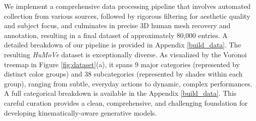 We implement a comprehensive data processing pipeline that involves automated collection from various sources, followed by rigorous filtering for aesthetic quality and subject focus, and culminates in precise 3D human mesh recovery and annotation, resulting in a final dataset of approximately 80,000 entries. A detailed breakdown of our pipeline is provided in Appendix \ref{build_data}.
The resulting \textit{HuMoVe} dataset is exceptionally diverse. As visualized by the Voronoi treemap in Figure \ref{fig:dataset}(a), it spans 9 major categories (represented by distinct color groups) and 38 subcategories (represented by shades within each group), ranging from subtle, everyday actions to dynamic, complex performances. A full categorical breakdown is available in the Appendix \ref{build_data}. This careful curation provides a clean, comprehensive, and challenging foundation for developing kinematically-aware generative models.


